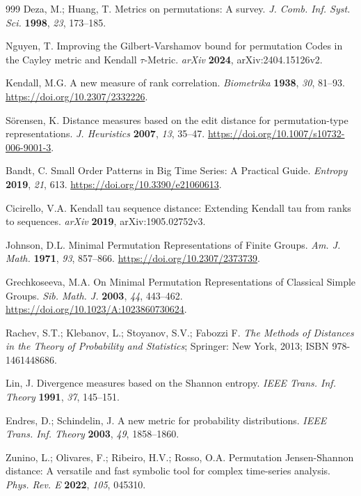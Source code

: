 \documentclass{article}
\begin{document}
\begin{thebibliography}{999}
 Deza, M.; Huang, T. Metrics on permutations: A survey.
\emph{J. Comb. Inf. Syst. Sci.} \textbf{1998}, \emph{23}, 173--185.

 Nguyen, T. Improving the Gilbert-Varshamov bound for
permutation Codes in the Cayley metric and Kendall $\tau $-Metric.
\emph{arXiv} \textbf{2024}, arXiv:2404.15126v2.

 Kendall, M.G. A new measure of rank correlation.
\emph{Biometrika} \textbf{1938}, \emph{30}, 81--93. \url{https://doi.org/10.2307/2332226}.

 S\"{o}rensen, K. Distance measures based on the edit
distance for permutation-type representations. \emph{J. Heuristics} \textbf{2007}, \emph{13}, 35--47. \url{https://doi.org/10.1007/s10732-006-9001-3}.

 Bandt, C. Small Order Patterns in Big Time Series: A
Practical Guide. \emph{Entropy} \textbf{2019}, \emph{21}, 613. \url{https://doi.org/10.3390/e21060613}.

 Cicirello, V.A. Kendall tau sequence distance:
Extending Kendall tau from ranks to sequences. \emph{arXiv}   \textbf{2019}, arXiv:1905.02752v3.

 Johnson, D.L. Minimal Permutation Representations of
Finite Groups. \emph{Am. J. Math.} \textbf{1971}, \emph{93}, 857--866. %
\url{https://doi.org/10.2307/2373739}. 

 Grechkoseeva, M.A. On Minimal Permutation
Representations of Classical Simple Groups. \emph{Sib. Math. J.} \textbf{2003}, \emph{44}, 443--462. \url{https://doi.org/10.1023/A:1023860730624}.  

 Rachev, S.T.; Klebanov, L.; Stoyanov, S.V.; Fabozzi F.
\emph{The Methods of Distances in the Theory of Probability and Statistics}; 
Springer: New York, %
2013; ISBN 978-1461448686.

 Lin, J. Divergence measures based on the Shannon entropy.
\emph{IEEE Trans. Inf. Theory} \textbf{1991}, \emph{37}, 145--151.

 Endres, D.; Schindelin, J. A new metric for probability
distributions. \emph{IEEE Trans. Inf. Theory} \textbf{2003}, \emph{49}, 1858--1860.

 Zunino, L.; Olivares, F.; Ribeiro, H.V.; Rosso, O.A.
Permutation Jensen-Shannon distance: A versatile and fast symbolic tool for
complex time-series analysis. \emph{Phys. Rev. E} \textbf{2022}, \emph{105}, 045310.


\end{thebibliography}
\end{document}
